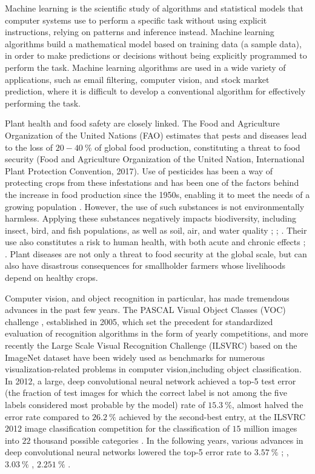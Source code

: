 \documentclass[12pt]{report}
\numberwithin{equation}{section}
\begin{document}
Machine learning is the scientific study of algorithms and statistical models that computer systems use to perform a specific task without using explicit instructions, relying on patterns and inference instead. Machine learning algorithms build a mathematical model based on training data (a sample data), in order to make predictions or decisions without being explicitly programmed to perform the task. Machine learning algorithms are used in a wide variety of applications, such as email filtering, computer vision, and stock market prediction, where it is difficult  to develop a conventional algorithm for effectively performing the task.  

Plant health and food safety are closely linked. The Food and Agriculture Organization of the United Nations (FAO) estimates that pests and diseases lead to the loss of $20-40\ \%$ of global food production, constituting a threat to food security (Food and Agriculture Organization of the United Nation, International Plant Protection Convention, 2017). Use of pesticides has been a way of protecting crops from these infestations and has been one of the factors behind the increase in food production since the 1950s, enabling it to meet the needs of a growing population {\cite{cooper}}. However, the use of such substances is not environmentally harmless. Applying these substances negatively impacts biodiversity, including insect, bird, and fish populations, as well as soil, air, and water quality {\cite{kaur}}; {\cite{bayo}}; {\cite{Knillmann}}. Their use also constitutes a risk to human health, with both acute and chronic effects {\cite{sanborn}}; {\cite{KIM2017525}}. Plant diseases are not only a threat to food security at the global scale, but can also have disastrous consequences for smallholder farmers whose livelihoods depend on healthy crops.

Computer vision, and object recognition in particular, has made tremendous advances in the past few years. The PASCAL Visual Object Classes (VOC) challenge {\cite{Everingham}}, established in 2005, which set the precedent for standardized evaluation of recognition algorithms in the form of yearly competitions, and more recently the Large Scale Visual Recognition Challenge (ILSVRC) {\cite{Russakovsky}} based on the ImageNet dataset {\cite{Deng}} have been widely used as benchmarks for numerous visualization-related problems in computer vision,including object classification. In 2012, a large, deep convolutional neural network achieved a top-5 test error (the fraction of test images for which the correct label is not among the five labels considered most probable by the model) rate of $15.3\ \%$, almost halved the error rate compared
to $26.2\ \%$ achieved by the second-best entry, at the ILSVRC 2012 image classification competition for the classification of $15$ million images into $22$ thousand possible categories {\cite{Krizhevsky}}. In the following years, various advances in deep convolutional neural networks lowered the top-5 error rate to $3.57\ \%$ {\cite{He2015DeepRL}}; {\cite{Szegedy}}, $3.03\ \%$ {\cite{Xie}}, $2.251\ \%$ {\cite{Hu2017SqueezeandExcitationN}}.
\end{document}
